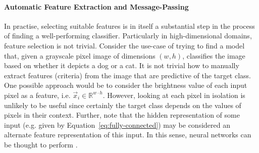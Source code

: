 \documentclass[
	fontsize=10pt, %
	twoside=false, %
	secnumdepth=1, %
  toc=indentunnumbered %
]{kaobook}
\begin{document}
\paragraph{Automatic Feature Extraction and Message-Passing}
In practise, selecting suitable features is in itself a substantial
step in the process of finding a well-performing classifier.
%
Particularly in high-dimensional domains, feature selection is not trivial.
Consider the use-case of trying to find a model that, given a grayscale pixel
image of dimensions $(w, h)$, classifies the image based on whether it depicts a
dog or a cat. It is not trivial how to manually extract features (criteria) from
the image that are predictive of the target class. One possible approach
would be to consider the brightness value of each input pixel as a feature, i.e.
$\vec x_i \in \mathbb{R}^{w \cdot h}$. However, looking at each
pixel in isolation is unlikely to be useful since certainly the target class
depends on the values of pixels in their context.
Further, note that the hidden representation of some input (e.g. given by
Equation~\ref{eq:fully-connected}) may be considered an alternate feature representation
of this input. In this sense, neural networks can be thought to perform
. 
\end{document}
